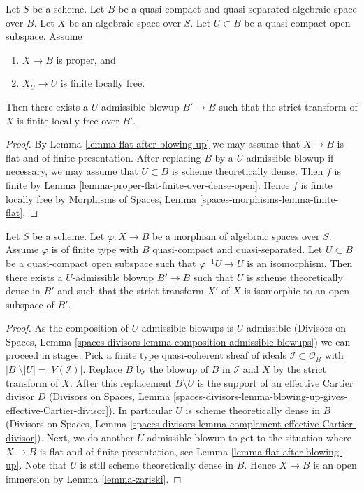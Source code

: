 \begin{lemma}
\label{lemma-finite-after-blowing-up}
Let $S$ be a scheme. Let $B$ be a quasi-compact and quasi-separated
algebraic space over $B$. Let $X$ be an algebraic space over $S$.
Let $U \subset B$ be a quasi-compact open subspace. Assume
\begin{enumerate}
\item $X \to B$ is proper, and
\item $X_U \to U$ is finite locally free.
\end{enumerate}
Then there exists a $U$-admissible blowup $B' \to B$ such that
the strict transform of $X$ is finite locally free over $B'$.
\end{lemma}

\begin{proof}
By Lemma \ref{lemma-flat-after-blowing-up} we may assume that
$X \to B$ is flat and of finite presentation. After replacing
$B$ by a $U$-admissible blowup if necessary, we may assume
that $U \subset B$ is scheme theoretically dense. Then $f$ is
finite by Lemma \ref{lemma-proper-flat-finite-over-dense-open}.
Hence $f$ is finite locally free by
Morphisms of Spaces, Lemma \ref{spaces-morphisms-lemma-finite-flat}.
\end{proof}

\begin{lemma}
\label{lemma-zariski-after-blowup}
Let $S$ be a scheme.
Let $\varphi : X \to B$ be a morphism of algebraic spaces over $S$.
Assume $\varphi$ is of finite type with $B$ quasi-compact and quasi-separated.
Let $U \subset B$ be a quasi-compact open subspace such that
$\varphi^{-1}U \to U$ is an isomorphism. Then there exists a $U$-admissible
blowup $B' \to B$ such that $U$ is scheme theoretically dense in $B'$
and such that the strict transform $X'$ of $X$ is isomorphic
to an open subspace of $B'$.
\end{lemma}

\begin{proof}
As the composition of $U$-admissible blowups is $U$-admissible
(Divisors on Spaces, Lemma
\ref{spaces-divisors-lemma-composition-admissible-blowups})
we can proceed in stages. Pick a finite type quasi-coherent sheaf
of ideals $\mathcal{I} \subset \mathcal{O}_B$ with
$|B| \setminus |U| = |V(\mathcal{I})|$. Replace $B$ by the blowup
of $B$ in $\mathcal{I}$ and $X$ by the strict transform of $X$.
After this replacement $B \setminus U$ is the support of an effective
Cartier divisor $D$ (Divisors on Spaces, Lemma
\ref{spaces-divisors-lemma-blowing-up-gives-effective-Cartier-divisor}).
In particular $U$ is scheme theoretically dense in $B$
(Divisors on Spaces, Lemma
\ref{spaces-divisors-lemma-complement-effective-Cartier-divisor}).
Next, we do another $U$-admissible blowup to get to the situation where
$X \to B$ is flat and of finite presentation, see
Lemma \ref{lemma-flat-after-blowing-up}. Note that $U$ is still scheme
theoretically dense in $B$. Hence $X \to B$ is an open immersion by
Lemma \ref{lemma-zariski}.
\end{proof}

